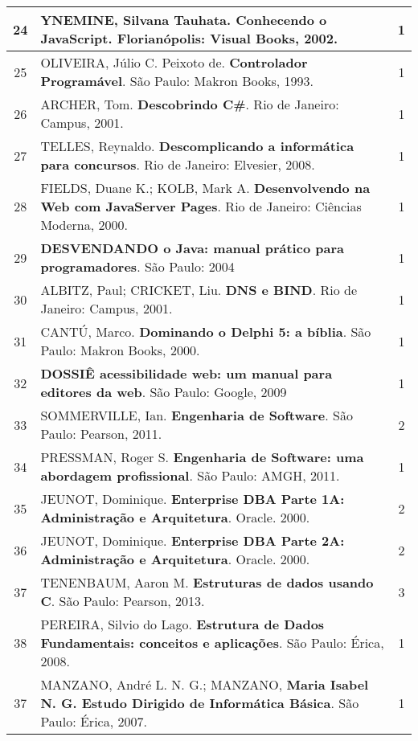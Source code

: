 \begin{longtable}{|c|p{115mm}|c|}
24      & YNEMINE, Silvana Tauhata. \textbf{Conhecendo o JavaScript}. Florianópolis: Visual Books, 2002. & 1          \\ \hline
25     & OLIVEIRA, Júlio C. Peixoto de. \textbf{Controlador Programável}. São Paulo: Makron Books, 1993. & 1          \\ \hline
26     & ARCHER, Tom. \textbf{Descobrindo C\#}. Rio de Janeiro: Campus, 2001.                   & 1          \\ \hline
27     & TELLES, Reynaldo. \textbf{Descomplicando a informática para concursos}. Rio de Janeiro: Elvesier, 2008. & 1          \\ \hline
28     & FIELDS, Duane K.; KOLB, Mark A. \textbf{Desenvolvendo na Web com JavaServer Pages}. Rio de Janeiro: Ciências Moderna, 2000. & 1          \\ \hline
29     & \textbf{DESVENDANDO o Java: manual prático para programadores}. São Paulo: 2004       & 1          \\ \hline
30     & ALBITZ, Paul; CRICKET, Liu. \textbf{DNS e BIND}. Rio de Janeiro: Campus, 2001.        & 1          \\ \hline
31     & CANTÚ, Marco. \textbf{Dominando o Delphi 5: a bíblia}. São Paulo: Makron Books, 2000.          & 1          \\ \hline
32      & \textbf{DOSSIÊ acessibilidade web: um manual para editores da web}. São Paulo: Google, 2009 & 1          \\ \hline
33     & SOMMERVILLE, Ian. \textbf{Engenharia de Software}. São Paulo: Pearson, 2011.                   & 2          \\ \hline
34     & PRESSMAN, Roger S. \textbf{Engenharia de Software: uma abordagem profissional}. São Paulo: AMGH, 2011. & 1          \\ \hline
35     & JEUNOT, Dominique. \textbf{Enterprise DBA Parte 1A: Administração e Arquitetura}. Oracle. 2000.& 2          \\ \hline
36     & JEUNOT, Dominique. \textbf{Enterprise DBA Parte 2A: Administração e Arquitetura}. Oracle. 2000. & 2          \\ \hline
37     & TENENBAUM, Aaron M. \textbf{Estruturas de dados usando C}. São Paulo: Pearson, 2013.  & 3          \\ \hline
38     & PEREIRA, Silvio do Lago. \textbf{Estrutura de Dados Fundamentais: conceitos e aplicações}. São Paulo: Érica, 2008. & 1          \\ \hline
37     & MANZANO, André L. N. G.; MANZANO, \textbf{Maria Isabel N. G. Estudo Dirigido de Informática Básica}. São Paulo: Érica, 2007. & 1          \\ \hline

\end{longtable}
